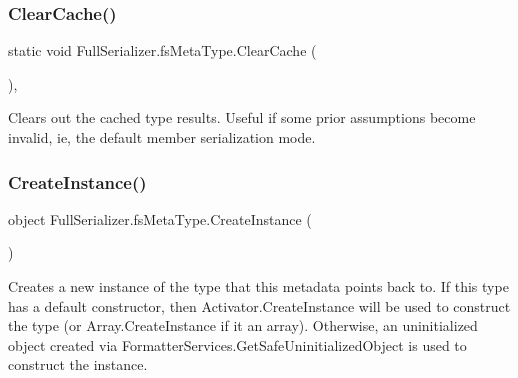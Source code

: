 \subsubsection{\texorpdfstring{Clear\+Cache()}{ClearCache()}}
{\footnotesize\ttfamily static void Full\+Serializer.\+fs\+Meta\+Type.\+Clear\+Cache (\begin{DoxyParamCaption}{ }\end{DoxyParamCaption})\hspace{0.3cm}{\ttfamily [inline]}, {\ttfamily [static]}}



Clears out the cached type results. Useful if some prior assumptions become invalid, ie, the default member serialization mode. 

\mbox{\label{class_full_serializer_1_1fs_meta_type_a2c5ea6c69f0e1bb29c6c4c11317926b5}} 
\subsubsection{\texorpdfstring{Create\+Instance()}{CreateInstance()}}
{\footnotesize\ttfamily object Full\+Serializer.\+fs\+Meta\+Type.\+Create\+Instance (\begin{DoxyParamCaption}{ }\end{DoxyParamCaption})\hspace{0.3cm}{\ttfamily [inline]}}



Creates a new instance of the type that this metadata points back to. If this type has a default constructor, then Activator.\+Create\+Instance will be used to construct the type (or Array.\+Create\+Instance if it an array). Otherwise, an uninitialized object created via Formatter\+Services.\+Get\+Safe\+Uninitialized\+Object is used to construct the instance. 

\mbox{\label{class_full_serializer_1_1fs_meta_type_a519eb6ef7c8ffe3b955a979007a1214c}} 
